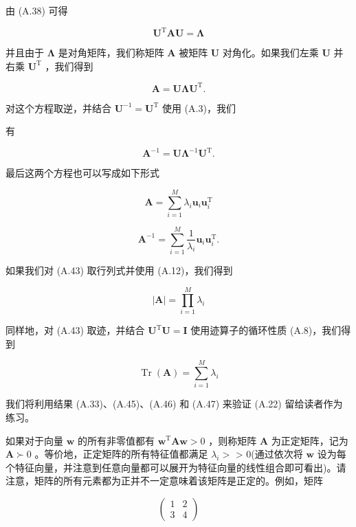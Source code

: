 \documentclass[10pt]{report}
\begin{document}
由 (A.38) 可得

\[
{\mathbf{U}}^{\mathrm{T}}\mathbf{A}\mathbf{U} = \mathbf{\Lambda } \tag{A.42}
\]

并且由于 \(\mathbf{\Lambda }\) 是对角矩阵，我们称矩阵 \(\mathbf{A}\) 被矩阵 \(\mathbf{U}\) 对角化。如果我们左乘 \(\mathbf{U}\) 并右乘 \({\mathbf{U}}^{\mathrm{T}}\) ，我们得到

\[
\mathbf{A} = \mathbf{U}\mathbf{\Lambda }{\mathbf{U}}^{\mathrm{T}}. \tag{A.43}
\]

对这个方程取逆，并结合 \({\mathbf{U}}^{-1} = {\mathbf{U}}^{\mathrm{T}}\) 使用 (A.3)，我们

有

\[
{\mathbf{A}}^{-1} = \mathbf{U}{\mathbf{\Lambda }}^{-1}{\mathbf{U}}^{\mathrm{T}}. \tag{A.44}
\]

最后这两个方程也可以写成如下形式

\[
\mathbf{A} = \mathop{\sum }\limits_{{i = 1}}^{M}{\lambda }_{i}{\mathbf{u}}_{i}{\mathbf{u}}_{i}^{\mathrm{T}} \tag{A.45}
\]

\[
{\mathbf{A}}^{-1} = \mathop{\sum }\limits_{{i = 1}}^{M}\frac{1}{{\lambda }_{i}}{\mathbf{u}}_{i}{\mathbf{u}}_{i}^{\mathrm{T}}. \tag{A.46}
\]

如果我们对 (A.43) 取行列式并使用 (A.12)，我们得到

\[
\left| \mathbf{A}\right|  = \mathop{\prod }\limits_{{i = 1}}^{M}{\lambda }_{i} \tag{A.47}
\]

同样地，对 (A.43) 取迹，并结合 \({\mathbf{U}}^{\mathrm{T}}\mathbf{U} = \mathbf{I}\) 使用迹算子的循环性质 (A.8)，我们得到

\[
\operatorname{Tr}\left( \mathbf{A}\right)  = \mathop{\sum }\limits_{{i = 1}}^{M}{\lambda }_{i} \tag{A.48}
\]

我们将利用结果 (A.33)、(A.45)、(A.46) 和 (A.47) 来验证 (A.22) 留给读者作为练习。

如果对于向量 \(\mathbf{w}\) 的所有非零值都有 \({\mathbf{w}}^{\mathrm{T}}\mathbf{A}\mathbf{w} > 0\) ，则称矩阵 \(\mathbf{A}\) 为正定矩阵，记为 \(\mathbf{A} \succ  0\) 。等价地，正定矩阵的所有特征值都满足 \({\lambda }_{i} >\) > 0(通过依次将 \(\mathbf{w}\) 设为每个特征向量，并注意到任意向量都可以展开为特征向量的线性组合即可看出)。请注意，矩阵的所有元素都为正并不一定意味着该矩阵是正定的。例如，矩阵

\[
\left( \begin{array}{ll} 1 & 2 \\  3 & 4 \end{array}\right)  \tag{A.49}
\]
\end{document}
